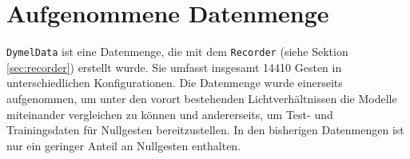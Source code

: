 \section{Aufgenommene Datenmenge}
\label{sec:DymelData}
\texttt{DymelData} ist eine Datenmenge, die mit dem \texttt{Recorder} (siehe Sektion \ref{sec:recorder}) erstellt wurde. Sie umfasst insgesamt 14410 Gesten in unterschiedlichen Konfigurationen. Die Datenmenge wurde
einerseits aufgenommen, um unter den vorort bestehenden Lichtverhältnissen die Modelle miteinander vergleichen zu können und andererseits, um Test- und Trainingsdaten für Nullgesten bereitzustellen. In den
bisherigen Datenmengen ist nur ein geringer Anteil an Nullgesten enthalten.
\newline
\newline
{}
